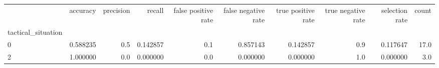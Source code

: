 \begin{tabular}{lrrrrrrrrr}
\toprule
{} &  accuracy &  precision &    recall &  false positive rate &  false negative rate &  true positive rate &  true negative rate &  selection rate &  count \\
tactical\_situation &           &            &           &                      &                      &                     &                     &                 &        \\
\midrule
0                  &  0.588235 &        0.5 &  0.142857 &                  0.1 &             0.857143 &            0.142857 &                 0.9 &        0.117647 &   17.0 \\
2                  &  1.000000 &        0.0 &  0.000000 &                  0.0 &             0.000000 &            0.000000 &                 1.0 &        0.000000 &    3.0 \\
\bottomrule
\end{tabular}
